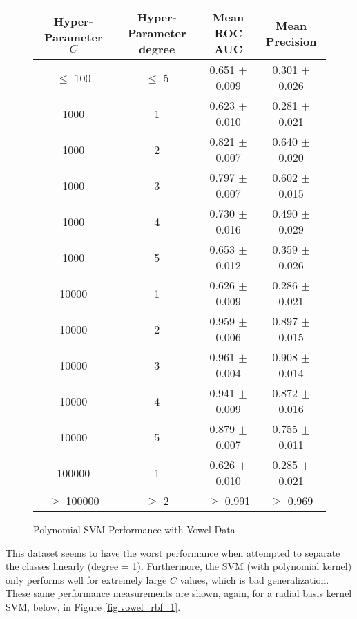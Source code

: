 \documentclass[tikz]{article}
\begin{document}
\begin{figure}[H]
\centering
\begin{tabular}{|c|c|c|c|}
\hline
Hyper-Parameter $C$ & Hyper-Parameter degree & Mean ROC AUC & Mean Precision \\
\hline
$\leq$ 100 & $\leq$ 5 & 0.651 $\pm$ 0.009 & 0.301 $\pm$ 0.026 \\
\hline
1000 & 1 & 0.623 $\pm$ 0.010 & 0.281 $\pm$ 0.021 \\
\hline
1000 & 2 & 0.821 $\pm$ 0.007 & 0.640 $\pm$ 0.020 \\
\hline
1000 & 3 & 0.797 $\pm$ 0.007 & 0.602 $\pm$ 0.015 \\
\hline
1000 & 4 & 0.730 $\pm$ 0.016 & 0.490 $\pm$ 0.029 \\
\hline
1000 & 5 & 0.653 $\pm$ 0.012 & 0.359 $\pm$ 0.026 \\
\hline
10000 & 1 & 0.626 $\pm$ 0.009 & 0.286 $\pm$ 0.021 \\
\hline
10000 & 2 & 0.959 $\pm$ 0.006 & 0.897 $\pm$ 0.015 \\
\hline
10000 & 3 & 0.961 $\pm$ 0.004 & 0.908 $\pm$ 0.014 \\
\hline
10000 & 4 & 0.941 $\pm$ 0.009 & 0.872 $\pm$ 0.016 \\
\hline
10000 & 5 & 0.879 $\pm$ 0.007 & 0.755 $\pm$ 0.011 \\
\hline
100000 & 1 & 0.626 $\pm$ 0.010 & 0.285 $\pm$ 0.021 \\
\hline
$\geq$ 100000 & $\geq$ 2 & $\geq$ 0.991 & $\geq$ 0.969 \\
\hline
\end{tabular}
\caption{Polynomial SVM Performance with Vowel Data}
\label{fig:vowel_poly_1}
\end{figure}

This dataset seems to have the worst performance when attempted to separate the classes linearly (degree = 1). Furthermore, the SVM (with polynomial kernel) only performs well for extremely large $C$ values, which is bad generalization. These same performance measurements are shown, again, for a radial basis kernel SVM, below, in Figure \ref{fig:vowel_rbf_1}.
\end{document}
